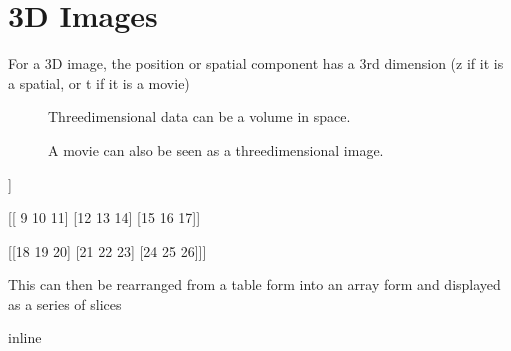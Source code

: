 \documentclass[letterpaper,10pt,english]{sphinxmanual}
\begin{document}
\section{3D Images}
\label{\detokenize{01-Introduction:d-images}}
\sphinxAtStartPar
For a 3D image, the position or spatial component has a 3rd dimension (z if it is a spatial, or t if it is a movie)



\begin{figure}[htbp]
\centering
\capstart

\noindent{}
\caption{Three\sphinxhyphen{}dimensional data can be a volume in space.}\label{\detokenize{01-Introduction:id8}}\end{figure}

\begin{figure}[htbp]
\centering
\capstart

\noindent{}
\caption{A movie can also be seen as a three\sphinxhyphen{}dimensional image.}\label{\detokenize{01-Introduction:id9}}\end{figure}

\begin{sphinxVerbatim}[commandchars=\\\{\}]
   
  
\end{sphinxVerbatim}

\begin{sphinxVerbatim}[commandchars=\\\{\}]
[[[ 0  1  2]
  [ 3  4  5]
  [ 6  7  8]]

 [[ 9 10 11]
  [12 13 14]
  [15 16 17]]

 [[18 19 20]
  [21 22 23]
  [24 25 26]]]
\end{sphinxVerbatim}

\sphinxAtStartPar
This can then be rearranged from a table form into an array form and displayed as a series of slices

\begin{sphinxVerbatim}[commandchars=\\\{\}]
 inline
   
     
   
      
\end{sphinxVerbatim}
\end{document}
